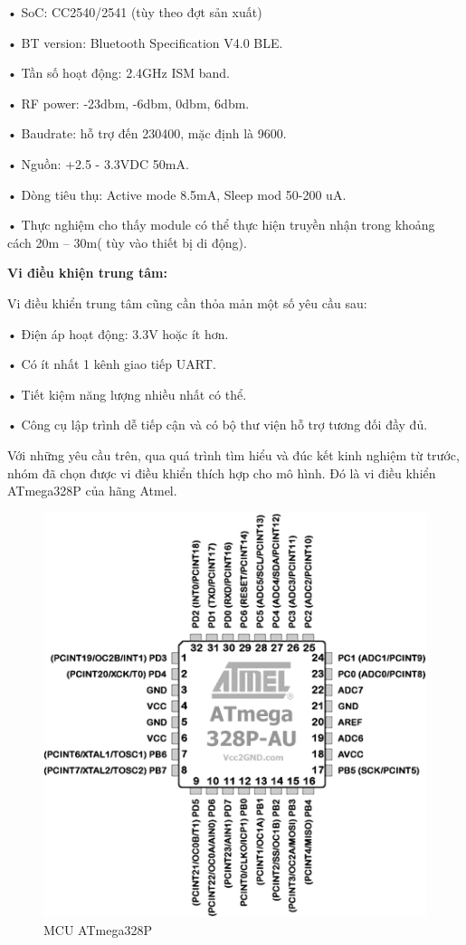 • SoC: CC2540/2541 (tùy theo đợt sản xuất)

• BT version: Bluetooth Specification V4.0 BLE.

• Tần số hoạt động: 2.4GHz ISM band.

• RF power: -23dbm, -6dbm, 0dbm, 6dbm.

• Baudrate: hỗ trợ đến 230400, mặc định là 9600.

• Nguồn: +2.5 - 3.3VDC 50mA.

• Dòng tiêu thụ: Active mode 8.5mA, Sleep mod 50-200 uA.

• Thực nghiệm cho thấy module có thể thực hiện truyền nhận trong khoảng cách 20m – 30m( tùy vào thiết bị di động).

\textbf{Vi điều khiện trung tâm:}

Vi điều khiển trung tâm cũng cần thỏa mản một số yêu cầu sau:

• Điện áp hoạt động: 3.3V hoặc ít hơn.

• Có ít nhất 1 kênh giao tiếp UART.

• Tiết kiệm năng lượng nhiều nhất có thể.

• Công cụ lập trình dễ tiếp cận và có bộ thư viện hỗ trợ tương đối đầy đủ.

Với những yêu cầu trên, qua quá trình tìm hiểu và đúc kết kinh nghiệm từ trước, nhóm đã chọn được vi điều khiển thích hợp cho mô hình. Đó là vi điều khiển ATmega328P của hãng Atmel.

\begin{figure}[H]
	\centering    
	\includegraphics[width=1.0\textwidth]{atmega}
	\caption[MCU ATmega328P]{MCU ATmega328P}
	\label{fig: atmega}
\end{figure}

